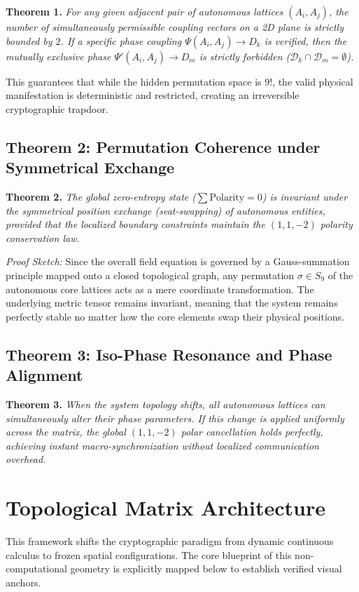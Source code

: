 \documentclass[11pt,twocolumn]{article}
\begin{document}
    \textbf{Theorem 1.} \textit{For any given adjacent pair of autonomous lattices $(A_i, A_j)$, the number of simultaneously permissible coupling vectors on a 2D plane is strictly bounded by $2$. If a specific phase coupling $\Psi(A_i, A_j) \to D_k$ is verified, then the mutually exclusive phase $\Psi'(A_i, A_j) \to D_m$ is strictly forbidden ($\mathcal{D}_k \cap \mathcal{D}_m = \emptyset$).}

    This guarantees that while the hidden permutation space is $9!$, the valid physical manifestation is deterministic and restricted, creating an irreversible cryptographic trapdoor.

    \subsection{Theorem 2: Permutation Coherence under Symmetrical Exchange}
    \textbf{Theorem 2.} \textit{The global zero-entropy state ($\sum \text{Polarity} = 0$) is invariant under the symmetrical position exchange (seat-swapping) of autonomous entities, provided that the localized boundary constraints maintain the $(1, 1, -2)$ polarity conservation law.}

    \textit{Proof Sketch:} Since the overall field equation is governed by a Gauss-summation principle mapped onto a closed topological graph, any permutation $\sigma \in S_9$ of the autonomous core lattices acts as a mere coordinate transformation. The underlying metric tensor remains invariant, meaning that the system remains perfectly stable no matter how the core elements swap their physical positions.

    \subsection{Theorem 3: Iso-Phase Resonance and Phase Alignment}
    \textbf{Theorem 3.} \textit{When the system topology shifts, all autonomous lattices can simultaneously alter their phase parameters. If this change is applied uniformly across the matrix, the global $(1, 1, -2)$ polar cancellation holds perfectly, achieving instant macro-synchronization without localized communication overhead.}

    \section{Topological Matrix Architecture}
    This framework shifts the cryptographic paradigm from dynamic continuous calculus to frozen spatial configurations. The core blueprint of this non-computational geometry is explicitly mapped below to establish verified visual anchors.
\end{document}
